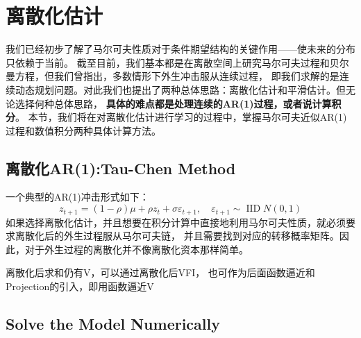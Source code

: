
\section{离散化估计}    \label{sec-discrete-approximation}

我们已经初步了解了马尔可夫性质对于条件期望结构的关键作用——使未来的分布只依赖于当前。
截至目前，我们基本都是在离散空间上研究马尔可夫过程和贝尔曼方程，但我们曾指出，多数情形下外生冲击服从连续过程，
即我们求解的是连续动态规划问题。对此我们也提出了两种总体思路：离散化估计和平滑估计。但无论选择何种总体思路，
\textbf{具体的难点都是处理连续的AR(1)过程，或者说计算积分}。
本节，我们将在对离散化估计进行学习的过程中，掌握马尔可夫近似AR(1)过程和数值积分两种具体计算方法。


\subsection{离散化AR(1):Tau-Chen Method}

一个典型的AR(1)冲击形式如下：
\begin{equation}    \label{eq-z-ar1}
    z_{t+1}=(1-\rho) \mu+\rho z_t+\sigma \varepsilon_{t+1}, \quad \varepsilon_{t+1} \sim \operatorname{IID} N(0,1)
\end{equation}
如果选择离散化估计，并且想要在积分计算中直接地利用马尔可夫性质，就必须要求离散化后的外生过程服从马尔可夫链，
并且需要找到对应的转移概率矩阵。因此，对于外生过程的离散化并不像离散化资本那样简单。


离散化后求和仍有V，可以通过离散化后VFI，
也可作为后面函数逼近和Projection的引入，即用函数逼近V


\subsection{Solve the Model Numerically}
